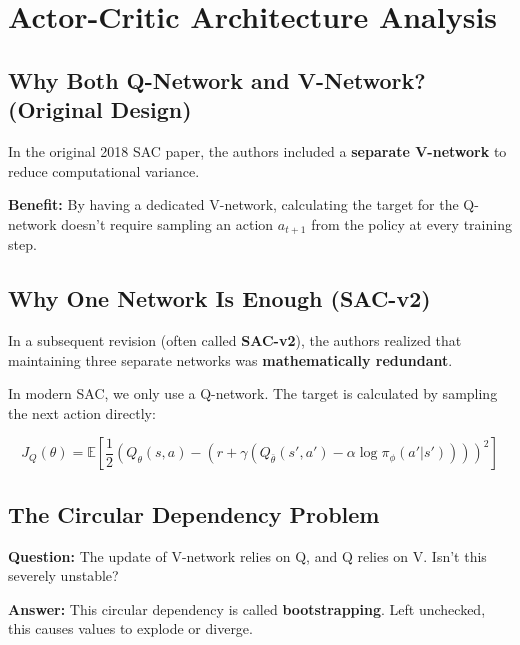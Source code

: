 \documentclass[12pt,a4paper]{article}
\theoremstyle{noteplain}
\theoremstyle{noteexercise}
\begin{document}

\section{Actor-Critic Architecture Analysis}\label{sec:arch-analysis}



\subsection{Why Both Q-Network and V-Network? (Original Design)}\label{ssec:v-network}



In the original 2018 SAC paper, the authors included a \textbf{separate V-network} to reduce computational variance.

\textbf{Benefit:} By having a dedicated V-network, calculating the target for the Q-network doesn't require sampling an action $a_{t+1}$ from the policy at every training step.



\subsection{Why One Network Is Enough (SAC-v2)}\label{ssec:sac-v2}



In a subsequent revision (often called \textbf{SAC-v2}), the authors realized that maintaining three separate networks was \textbf{mathematically redundant}.

In modern SAC, we only use a Q-network. The target is calculated by sampling the next action directly:

$$J_Q(\theta) = \mathbb{E}\left[\frac{1}{2}\left(Q_\theta(s,a) - (r + \gamma(Q_{\bar{\theta}}(s', a') - \alpha \log\pi_\phi(a'|s')))\right)^2\right]$$



\subsection{The Circular Dependency Problem}\label{ssec:circular}



\textbf{Question:} The update of V-network relies on Q, and Q relies on V. Isn't this severely unstable?

\textbf{Answer:} This circular dependency is called \textbf{bootstrapping}. Left unchecked, this causes values to explode or diverge.
\end{document}
